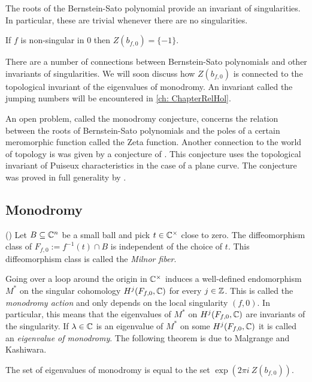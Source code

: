 The roots of the Bernstein-Sato polynomial provide an invariant of singularities.
In particular, these are trivial whenever there are no singularities.
\begin{proposition}{\cite[Section 4.2]{igusa2007introduction}}
  If $f$ is non-singular in $0$ then $Z(b_{f,0}) = \{-1\}$.
\end{proposition}
\begin{remark}
  There are a number of connections between Bernstein-Sato polynomials and other invariants of singularities.
  We will soon discuss how $Z(b_{f,0})$ is connected to the topological invariant of the eigenvalues of monodromy.
  An invariant called the jumping numbers will be encountered in \cref{ch: ChapterRelHol}.

  An open problem, called the monodromy conjecture, concerns the relation between the roots of Bernstein-Sato polynomials and the poles of a certain meromorphic function called the Zeta function.
  Another connection to the world of topology is was given by a conjecture of \cite{yano1982exponents}.
  This conjecture uses the topological invariant of Puiseux characteristics in the case of a plane curve.
  The conjecture was proved in full generality by \cite{blanco2019yano}.
\end{remark}

\subsection{Monodromy}
\begin{theorem}{(\cite{milnor1968singular})}
  Let $B\subseteq \mathbb{C}^n$ be a small ball and pick $t\in \mathbb{C}^\times$ close to zero.
  The diffeomorphism class of $F_{f,0} := f^{-1}(t)\cap B $  is independent of the choice of $t$.
  This diffeomorphism class is called the {\it Milnor fiber}.
\end{theorem}
Going over a loop around the origin in $\mathbb{C}^\times$ induces a well-defined endomorphism $M^*$ on the singular cohomology $H^j(F_{f,0},\mathbb{C})$ for every $j\in \mathbb{Z}$.
This is called the {\it monodromy action} and only depends on the local singularity $(f,0)$.
In particular, this means that the eigenvalues of $M^*$ on $H^j(F_{f,0},\mathbb{C})$ are invariants of the singularity.
If $\lambda \in \mathbb{C}$ is an eigenvalue of $M^*$ on some $H^j(F_{f,0},\mathbb{C})$ it is called an {\it eigenvalue of monodromy}.
The following theorem is due to Malgrange and Kashiwara.
\begin{theorem}\label{thm: EigMonodromy}
The set of eigenvalues of monodromy is equal to the set $\exp(2\pi i\ Z(b_{f,0}))$.
\end{theorem}

